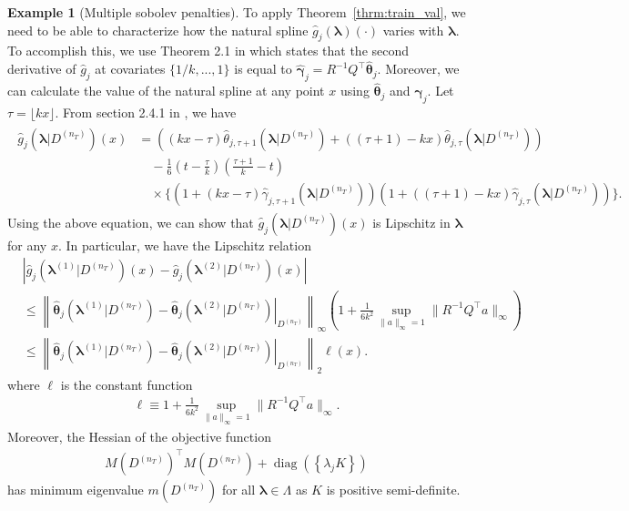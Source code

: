 \documentclass[12pt]{article} %
\theoremstyle{definition}
\newtheorem{example}{Example}
\DeclareMathOperator{\diag}{diag}
\begin{document}
\begin{example}[Multiple sobolev penalties]
	To apply Theorem~\ref{thrm:train_val}, we need to be able to characterize how the natural spline $\hat{g}_j(\boldsymbol{\lambda})(\cdot)$ varies with $\boldsymbol{\lambda}$.
	To accomplish this, we use Theorem 2.1 in \citet{green1993nonparametric} which states that the second derivative of $\hat{g}_j$ at covariates $\{1/k, ..., 1\}$ is equal to $\hat{\boldsymbol{\gamma}}_j = R^{-1} Q^\top \hat{\boldsymbol{\theta}}_j$.
	Moreover, we can calculate the value of the natural spline at any point $x$ using $\hat{\boldsymbol{\theta}}_j$ and $\hat{\boldsymbol{\gamma}}_j$.
	Let $\tau = \lfloor kx \rfloor$.
	From section 2.4.1 in \citet{green1993nonparametric}, we have
	\begin{align}
	\begin{split}
	\hat{g}_j(\boldsymbol{\lambda} | D^{(n_T)})(x) &
	=
	\left(
	(kx - \tau) \hat{\theta}_{j,\tau + 1}(\boldsymbol{\lambda} | D^{(n_T)})
	+ ((\tau + 1) - kx) \hat{\theta}_{j, \tau}(\boldsymbol{\lambda} | D^{(n_T)})
	\right)\\
	& \quad - \frac{1}{6}
	\left (t - \frac{\tau}{k} \right )
	\left (\frac{\tau + 1}{k} - t \right)\\
	& \quad \times
	\{
	\left(
	1 + (kx - \tau) \hat{\gamma}_{j,\tau + 1}(\boldsymbol{\lambda} | D^{(n_T)})
	\right)
	\left(
	1 + ((\tau + 1) - kx) \hat{\gamma}_{j,\tau}(\boldsymbol{\lambda} | D^{(n_T)})
	\right)
	\}.
	\end{split}
	\end{align}
	Using the above equation, we can show that $\hat{g}_j(\boldsymbol{\lambda} | D^{(n_T)})(x)$ is Lipschitz in $\boldsymbol{\lambda}$ for any $x$.
	In particular, we have the Lipschitz relation
	\begin{align}
	& \left | \hat{g}_j(\boldsymbol{\lambda}^{(1)} | D^{(n_T)})(x) - \hat{g}_j(\boldsymbol{\lambda}^{(2)} | D^{(n_T)})(x) \right | \\
	& \le
	\left \|
	\left . \hat{\boldsymbol{\theta}}_j(\boldsymbol{\lambda}^{(1)} | D^{(n_T)}) - \hat{\boldsymbol{\theta}}_j(\boldsymbol{\lambda}^{(2)} | D^{(n_T)}) \right |_{D^{(n_T)}}
	\right \|_\infty
	\left(
	1 + \frac{1}{6 k^2} \sup_{\|a\|_\infty = 1} \|R^{-1} Q^\top a\|_\infty
	\right)\\
	& \le
	\left \|
	\left . \hat{\boldsymbol{\theta}}_j(\boldsymbol{\lambda}^{(1)} | D^{(n_T)}) - \hat{\boldsymbol{\theta}}_j(\boldsymbol{\lambda}^{(2)} | D^{(n_T)}) \right |_{D^{(n_T)}}
	\right \|_2
	\ell(x).
	\end{align}
	where $\ell$ is the constant function
	\begin{align}
	\ell \equiv 1 + \frac{1}{6 k^2} \sup_{\|a\|_\infty = 1} \|R^{-1} Q^\top a\|_\infty.
	\label{eq:sobolev_ell}
	\end{align}
	Moreover, the Hessian of the objective function
	\begin{align}
	M(D^{(n_T)})^\top M(D^{(n_T)}) + \diag \left (
	\left \{
	\lambda_j K
	\right \} \right )
	\end{align}
	has minimum eigenvalue $m(D^{(n_T)})$ for all $\boldsymbol{\lambda} \in \Lambda$ as $K$ is positive semi-definite.
	

\end{example}
\end{document}
